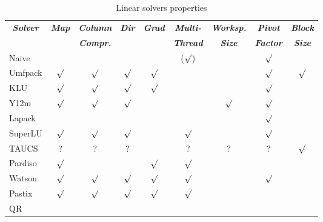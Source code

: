 \begin{table}
\centering
\caption{Linear solvers properties}\label{tab:linear-solvers-props}
\begin{tabular}{lcccccccc}
\hline
	\multicolumn{1}{c}{\textbf{\emph{Solver}}} &
	\multicolumn{1}{c}{\textbf{\emph{Map}}} &
	\multicolumn{1}{c}{\textbf{\emph{Column}}} &
	\multicolumn{1}{c}{\textbf{\emph{Dir}}} &
        \multicolumn{1}{c}{\textbf{\emph{Grad}}} &
	\multicolumn{1}{c}{\textbf{\emph{Multi-}}} &
	\multicolumn{1}{c}{\textbf{\emph{Worksp.}}} &
	\multicolumn{1}{c}{\textbf{\emph{Pivot}}} &
	\multicolumn{1}{c}{\textbf{\emph{Block}}} \\
	& & \multicolumn{1}{c}{\textbf{\emph{Compr.}}} & &
	& \multicolumn{1}{c}{\textbf{\emph{Thread}}}
	& \multicolumn{1}{c}{\textbf{\emph{Size}}}
	& \multicolumn{1}{c}{\textbf{\emph{Factor}}}
	  & \multicolumn{1}{c}{\textbf{\emph{Size}}} \\
\hline\hline
	Naive		&         &         &         &           & ($\surd$) &         & $\surd$ &	    \\ 
	Umfpack		& $\surd$ & $\surd$ & $\surd$ & $\surd$   &           &         & $\surd$ & $\surd$ \\ 
	KLU		& $\surd$ & $\surd$ & $\surd$ & $\surd$   &           &         & $\surd$ &	    \\ 
	Y12m		& $\surd$ & $\surd$ & $\surd$ &           &	      & $\surd$ & $\surd$ &	    \\ 
	Lapack		&         &         &         &           &           &         & $\surd$ &         \\ 
	SuperLU		& $\surd$ & $\surd$ & $\surd$ &           & $\surd$   &         & $\surd$ &	    \\ 
	TAUCS		& ?       & ?       & ?       &           & ?         & ?       & ?       & $\surd$ \\ 
	Pardiso		& $\surd$ &         &         & $\surd$   & $\surd$   &         &         &	    \\ 
	Watson		& $\surd$ & $\surd$ & $\surd$ & $\surd$   & $\surd$   &         & $\surd$ &	    \\ 
	Pastix		& $\surd$ & $\surd$ & $\surd$ & $\surd$   & $\surd$   &         &         &	    \\ 
	QR		&         &         &         &           &           &         &         &	    \\ 

\end{tabular}
\end{table}
